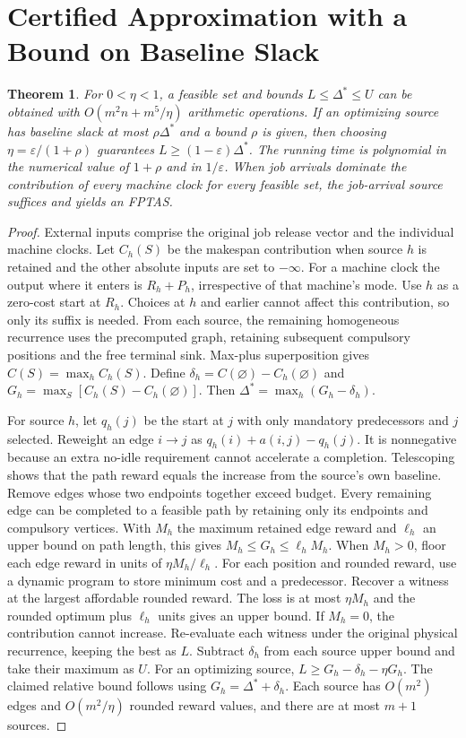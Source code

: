 \documentclass[11pt,letterpaper]{article}
\newtheorem{theorem}{Theorem}
\begin{document}
\section{Certified Approximation with a Bound on Baseline Slack}
\label{sec:approx}

\begin{theorem}
\label{thm:approx}
For $0<\eta<1$, a feasible set and bounds $L\le\Delta^*\le U$ can be obtained with $O(m^2n+m^5/\eta)$ arithmetic operations. If an optimizing source has baseline slack at most $\rho\Delta^*$ and a bound $\rho$ is given, then choosing $\eta=\varepsilon/(1+\rho)$ guarantees $L\ge(1-\varepsilon)\Delta^*$. The running time is polynomial in the numerical value of $1+\rho$ and in $1/\varepsilon$. When job arrivals dominate the contribution of every machine clock for every feasible set, the job-arrival source suffices and yields an FPTAS.
\end{theorem}

\begin{proof}
External inputs comprise the original job release vector and the individual machine clocks. Let $C_h(S)$ be the makespan contribution when source $h$ is retained and the other absolute inputs are set to $-\infty$. For a machine clock the output where it enters is $R_h+P_h$, irrespective of that machine's mode. Use $h$ as a zero-cost start at $R_h$. Choices at $h$ and earlier cannot affect this contribution, so only its suffix is needed. From each source, the remaining homogeneous recurrence uses the precomputed graph, retaining subsequent compulsory positions and the free terminal sink. Max-plus superposition gives $C(S)=\max_h C_h(S)$. Define $\delta_h=C(\varnothing)-C_h(\varnothing)$ and $G_h=\max_S[C_h(S)-C_h(\varnothing)]$. Then $\Delta^*=\max_h(G_h-\delta_h)$.

For source $h$, let $q_h(j)$ be the start at $j$ with only mandatory predecessors and $j$ selected. Reweight an edge $i\to j$ as $q_h(i)+a(i,j)-q_h(j)$. It is nonnegative because an extra no-idle requirement cannot accelerate a completion. Telescoping shows that the path reward equals the increase from the source's own baseline. Remove edges whose two endpoints together exceed budget. Every remaining edge can be completed to a feasible path by retaining only its endpoints and compulsory vertices. With $M_h$ the maximum retained edge reward and $\ell_h$ an upper bound on path length, this gives $M_h\le G_h\le\ell_h M_h$. When $M_h>0$, floor each edge reward in units of $\eta M_h/\ell_h$. For each position and rounded reward, use a dynamic program to store minimum cost and a predecessor. Recover a witness at the largest affordable rounded reward. The loss is at most $\eta M_h$ and the rounded optimum plus $\ell_h$ units gives an upper bound. If $M_h=0$, the contribution cannot increase. Re-evaluate each witness under the original physical recurrence, keeping the best as $L$. Subtract $\delta_h$ from each source upper bound and take their maximum as $U$. For an optimizing source, $L\ge G_h-\delta_h-\eta G_h$. The claimed relative bound follows using $G_h=\Delta^*+\delta_h$. Each source has $O(m^2)$ edges and $O(m^2/\eta)$ rounded reward values, and there are at most $m+1$ sources.
\end{proof}
\end{document}
